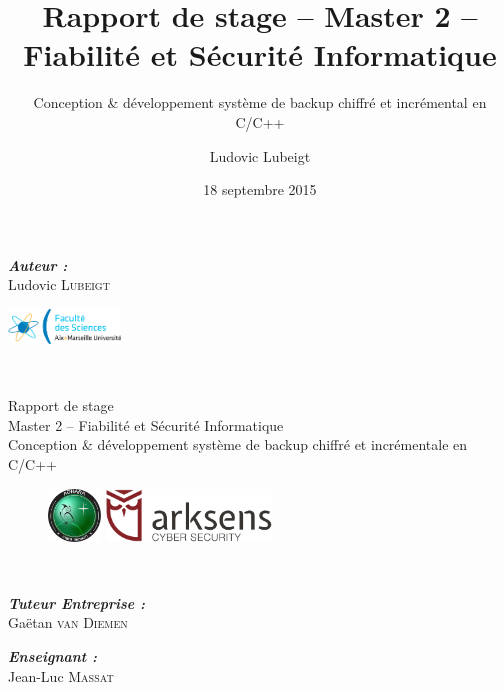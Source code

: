 \documentclass{beamer}
\title{Rapport de stage -- Master 2 -- Fiabilité et Sécurité Informatique}
\subtitle{Conception \&  d\'eveloppement syst\`eme de backup chiffr\'e et
incr\'emental en C/C++}
\author{Ludovic Lubeigt}
\institute{Aix-Marseille Universit\'e}
\date{18 septembre 2015}
\begin{document}
\begin{frame}
  \begin{minipage}{0.49\textwidth}
    \begin{flushleft}
      \emph{\bfseries Auteur :}\\
      Ludovic \textsc{Lubeigt}
    \end{flushleft}
  \end{minipage}
  \begin{minipage}{0.49\textwidth}
    \begin{flushright}
      \includegraphics[width=3cm]{logo_sciences.png}
    \end{flushright}
  \end{minipage}\\[2mm]

   
  \begin{beamerboxesrounded}[lower=arkblocklow, shadow=true]{}
    \centering\Large
    Rapport de stage\\ Master 2 -- Fiabilité et Sécurité Informatique\\
    Conception \& développement système de backup chiffré et incrémentale en
    C/C++
  \end{beamerboxesrounded}
  
  \begin{figure}[H]
    \begin{minipage}[t]{0.49\textwidth}
      \centering
      \includegraphics[height=1.4cm]{logo_adhara.png}
    \end{minipage}
    \begin{minipage}[t]{0.49\textwidth}
      \centering
      \includegraphics[height=1.4cm]{logo_arksens.png}
    \end{minipage}\\[1mm]
  \end{figure}
    
  \begin{minipage}{0.49\textwidth}
    \begin{flushleft}
      \emph{\bfseries Tuteur Entreprise :}\\
      Gaëtan \textsc{van Diemen}
    \end{flushleft}
  \end{minipage}
  \begin{minipage}{0.49\textwidth}
    \begin{flushright}
      \emph{\bfseries Enseignant :}\\
      Jean-Luc \textsc{Massat}
    \end{flushright}
  \end{minipage}\\[1mm]
  

\end{frame}
\end{document}
